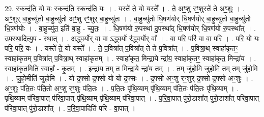 \documentclass[17pt]{extarticle}
\begin{document}
29. स्कन्द॑ति॒ यो यः स्कन्द॑ति॒ स्कन्द॑ति॒ यः । . यस्ते॑ ते॒ यो यस्ते᳚ । . ते॒ अꣳ॒॒शु रꣳ॒॒शुस्ते॑ ते अꣳ॒॒शुः । . अꣳ॒॒शुर् बा॒हुच्यु॑तो बा॒हुच्यु॑तो अꣳ॒॒शु रꣳ॒॒शुर् बा॒हुच्यु॑तः । . बा॒हुच्यु॑तो धि॒षण॑योर् धि॒षण॑योर् बा॒हुच्यु॑तो बा॒हुच्यु॑तो धि॒षण॑योः । . बा॒हुच्यु॑त॒ इति॑ बा॒हु - च्यु॒तः॒ । . धि॒षण॑यो रु॒पस्था॑ दु॒पस्था᳚द् धि॒षण॑योर् धि॒षण॑यो रु॒पस्था᳚त् । . उ॒पस्था॒दित्यु॒प - स्था॒त् । . अ॒द्ध्व॒र्योर् वा॑ वा ऽद्ध्व॒र्यो र॑द्ध्व॒र्योर् वा᳚ । . वा॒ परि॒ परि॑ वा वा॒ परि॑ । . परि॒ यो यः परि॒ परि॒ यः । . यस्ते॑ ते॒ यो यस्ते᳚ । . ते॒ प॒वित्रा᳚त् प॒वित्रा᳚त् ते ते प॒वित्रा᳚त् । . प॒वित्रा॒थ् स्वाहा॑कृतꣳ॒॒ स्वाहा॑कृतम् प॒वित्रा᳚त् प॒वित्रा॒थ् स्वाहा॑कृतम् । . स्वाहा॑कृत॒ मिन्द्रा॒ये न्द्रा॑य॒ स्वाहा॑कृतꣳ॒॒ स्वाहा॑कृत॒ मिन्द्रा॑य । . स्वाहा॑कृत॒मिति॒ स्वाहा᳚ - कृ॒त॒म् । . इन्द्रा॑य॒ तम् त मिन्द्रा॒ये न्द्रा॑य॒ तम् । . तम् जु॑होमि जुहोमि॒ तम् तम् जु॑होमि । . जु॒हो॒मीति॑ जुहोमि । . यो द्र॒फ्सो द्र॒फ्सो यो यो द्र॒फ्सः । . द्र॒फ्सो अꣳ॒॒शु रꣳ॒॒शुर् द्र॒फ्सो द्र॒फ्सो अꣳ॒॒शुः । . अꣳ॒॒शुः प॑ति॒तः प॑ति॒तो अꣳ॒॒शु रꣳ॒॒शुः प॑ति॒तः । . प॒ति॒तः पृ॑थि॒व्याम् पृ॑थि॒व्याम् प॑ति॒तः प॑ति॒तः पृ॑थि॒व्याम् । . पृ॒थि॒व्याम् प॑रिवा॒पात् प॑रिवा॒पात् पृ॑थि॒व्याम् पृ॑थि॒व्याम् प॑रिवा॒पात् । . प॒रि॒वा॒पात् पु॑रो॒डाशा᳚त् पुरो॒डाशा᳚त् परिवा॒पात् प॑रिवा॒पात् पु॑रो॒डाशा᳚त् । . प॒रि॒वा॒पादिति॑ परि - वा॒पात् । \newline
\end{document}
